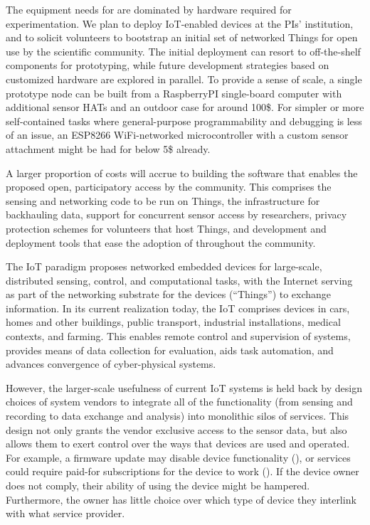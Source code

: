 The equipment needs for \sysname are dominated by hardware required
for experimentation. We plan to deploy \gls{IoT}-enabled devices
at the PIs' institution, and to solicit volunteers to bootstrap an
initial set of networked Things for open use by the scientific community.
The initial deployment can resort to off-the-shelf components
for prototyping, while future development strategies based on
customized hardware are explored in parallel.
To provide a sense of scale, a single prototype node can be built
from a RaspberryPI single-board computer with additional sensor
\glspl{HAT} and an outdoor case for around 100\$.
For simpler or more self-contained tasks where general-purpose
programmability and debugging is less of an issue, an ESP8266
WiFi-networked microcontroller with a custom sensor attachment
might be had for below 5\$ already.

A larger proportion of costs will accrue to building the software
that enables the proposed open, participatory access by the community.
This comprises the sensing and networking code to be run on Things,
the infrastructure for backhauling data, support for concurrent
sensor access by researchers, privacy protection schemes for
volunteers that host Things, and development and deployment tools
that ease the adoption of \sysname throughout the community.


The \acrfull{IoT} paradigm proposes networked embedded devices
for large-scale, distributed sensing, control, and computational tasks,
with the Internet serving as part of the networking substrate for
the devices (``Things'') to exchange information.
In its current realization today, the \acrlong{IoT} comprises
devices in cars, homes and other buildings, public transport,
industrial installations, medical contexts, and farming.
This enables remote control and supervision of systems, provides
means of data collection for evaluation, aids
task automation, and advances convergence of cyber-physical systems.

However, the larger-scale usefulness of current \acrlong{IoT}
systems is held back by design choices of system vendors to
integrate all of the functionality (from sensing and recording
to data exchange and analysis) into monolithic silos of services.
This design not only grants the vendor exclusive access to the
sensor data, but also allows them to exert control over the ways
that devices are used and operated. For example, a firmware update
may disable device functionality (), or services could
require paid-for subscriptions for the device to work
().
If the device owner does not comply, their ability of using
the device might be hampered. Furthermore, the owner has little
choice over which type of device they interlink with what service
provider.

